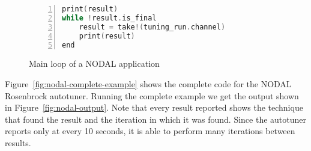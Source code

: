 \begin{figure}[htpb]
    \begin{minipage}{\linewidth}
    \begin{lstlisting}[language=C, basicstyle=\ttfamily\scriptsize,
        numbers=left,
        frame=no, showspaces=false, showstringspaces=false,
        numberstyle=\scriptsize,
        xleftmargin=1.5cm,
        keywords={%
            @spawnat, remotecall, Nullable, Any,
            @fetch, Future, Array, Float64, julia,
            while, true, function, end, put!,
            take!, sleep, RemoteChannel, Channel,
            Int, Tuple, const, addprocs, @schedule,
            @everywhere, for, in, myid, @async,
            remote_do, workers, Result, Real,
            AbstractFloat, deepcopy, rand, exp, true,
            Function, false, Run, mutable, struct,
            begin, Configuration, Dict, Symbol, using, import,
            FloatParameter, @spawn, while,
            ResultChannel, AbstractChannel, return%
        },
        otherkeywords={::, \&, \*, +, -, /, [, ], >, <, put!, take!, neighbor!,
                       update!}
    ]
print(result)
while !result.is_final
    result = take!(tuning_run.channel)
    print(result)
end
    \end{lstlisting}
    \end{minipage}
    \caption{Main loop of a NODAL application}
    \label{fig:nodal-mainloop}
\end{figure}

Figure~\ref{fig:nodal-complete-example} shows the complete code for the NODAL
Rosenbrock autotuner.  Running the complete example we get the output shown in
Figure~\ref{fig:nodal-output}.  Note that every result reported shows the
technique that found the result and the iteration in which it was found. Since
the autotuner reports only at every 10 seconds, it is able to perform many
iterations between results.

